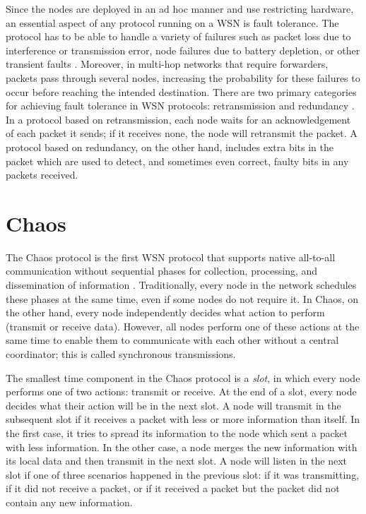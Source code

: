Since the nodes are deployed in an ad hoc manner and use restricting hardware, an essential aspect of any protocol running on a WSN is fault tolerance. The protocol has to be able to handle a variety of failures such as packet loss due to interference or transmission error, node failures due to battery depletion, or other transient faults \cite{Mahmood2015-reliability-survey}. Moreover, in multi-hop networks that require forwarders, packets pass through several nodes, increasing the probability for these failures to occur before reaching the intended destination. There are two primary categories for achieving fault tolerance in WSN protocols: retransmission and redundancy \cite{Mahmood2015-reliability-survey}. In a protocol based on retransmission, each node waits for an acknowledgement of each packet it sends; if it receives none, the node will retransmit the packet. A protocol based on redundancy, on the other hand, includes extra bits in the packet which are used to detect, and sometimes even correct, faulty bits in any packets received.



\section{Chaos}
The Chaos protocol is the first WSN protocol that supports native all-to-all communication without sequential phases for collection, processing, and dissemination of information \cite{chaos-introduction-paper}. Traditionally, every node in the network schedules these phases at the same time, even if some nodes do not require it. In Chaos, on the other hand, every node independently decides what action to perform (transmit or receive data). However, all nodes perform one of these actions at the same time to enable them to communicate with each other without a central coordinator; this is called synchronous transmissions.


The smallest time component in the Chaos protocol is a \textit{slot}, in which every node performs one of two actions: transmit or receive. At the end of a slot, every node decides what their action will be in the next slot.
A node will transmit in the subsequent slot if it receives a packet with less or more information than itself. In the first case, it tries to spread its information to the node which sent a packet with less information. In the other case, a node merges the new information with its local data and then transmit in the next slot. A node will listen in the next slot if one of three scenarios happened in the previous slot: if it was transmitting, if it did not receive a packet, or if it received a packet but the packet did not contain any new information. 

